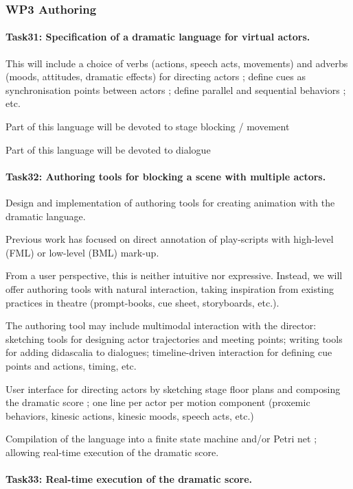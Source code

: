 \subsubsection{WP3 Authoring}

\paragraph{Task31: Specification of a dramatic language for virtual actors.}

This will include a choice of verbs (actions, speech acts, movements) and adverbs (moods, attitudes, dramatic effects) 
for directing actors ; define cues as synchronisation points between actors ; define parallel and sequential behaviors ; etc.

Part of this language will be devoted to stage blocking / movement

Part of this language will be devoted to dialogue


\paragraph{Task32: Authoring tools for blocking a scene with multiple actors.}

Design and implementation of authoring tools for creating animation with the dramatic language.

Previous work has focused on direct annotation of play-scripts with high-level (FML) or low-level (BML) mark-up.

From a user perspective, this is neither intuitive nor expressive. Instead, we will offer authoring tools
with natural interaction, taking inspiration from existing practices in theatre (prompt-books, cue sheet, storyboards, etc.).


The authoring tool may include multimodal interaction with the director: sketching tools for designing actor trajectories
and meeting points; writing tools for adding didascalia to dialogues; timeline-driven interaction for defining cue points
and actions, timing, etc.

User interface for directing actors by sketching stage floor plans and composing the dramatic score ; one line per actor per motion component (proxemic behaviors, kinesic actions, kinesic moods, speech acts, etc.)

Compilation of the language into a finite state machine and/or Petri net ; allowing real-time execution of the dramatic score.


\paragraph{Task33: Real-time execution of the dramatic score.} 

